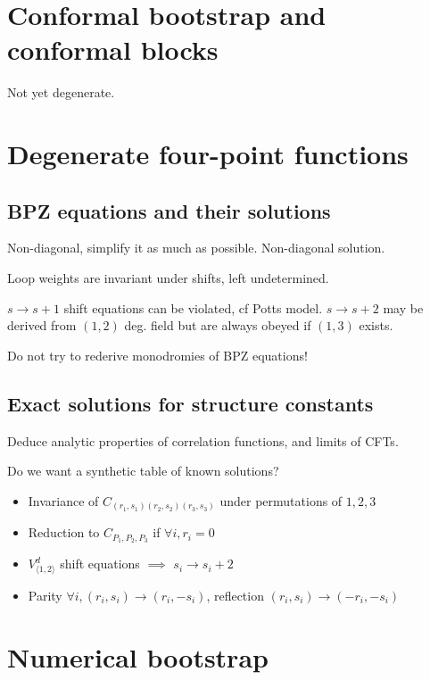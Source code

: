 \documentclass[12pt, a4paper]{article}
\theoremstyle{break}
\begin{document}
\section{Conformal bootstrap and conformal blocks}

Not yet degenerate. 

\section{Degenerate four-point functions}

\subsection{BPZ equations and their solutions}

Non-diagonal, simplify it as much as possible. Non-diagonal solution. 

Loop weights are invariant under shifts, left undetermined. 

$s\to s+1$ shift equations can be violated, cf Potts model. $s\to s+2$ may be derived from $(1,2)$ deg. field but are always obeyed if $(1,3)$ exists. 

Do not try to rederive monodromies of BPZ equations! 

\subsection{Exact solutions for structure constants}

Deduce analytic properties of correlation functions, and limits of CFTs. 

Do we want a synthetic table of known solutions? 

\begin{itemize}
\item Invariance of $C_{(r_1,s_1)(r_2,s_2)(r_3,s_3)}$ under permutations of $1,2,3$
\item Reduction to $C_{P_1,P_2,P_3}$ if $\forall i, r_i=0$ 
 \item $V_{\langle 1,2\rangle}^d$ shift equations $\implies$ $s_i\to s_i+2$  
 \item Parity $\forall i, (r_i,s_i)\to (r_i,-s_i)$, reflection $(r_i,s_i)\to (-r_i,-s_i)$
\end{itemize}


\section{Numerical bootstrap}
\end{document}
